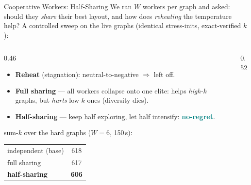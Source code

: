 \begin{frame}{Cooperative Workers: Half-Sharing}
  We ran $W$ workers per graph and asked: should they \emph{share} their best layout,
  and how does \emph{reheating} the temperature help? A controlled sweep on the live
  graphs (identical stress-inits, exact-verified $k$):
  \medskip
  \begin{columns}[T]
    \begin{column}{0.46\textwidth}
      \begin{itemize}
        \item \textbf{Reheat} (stagnation): neutral-to-negative $\Rightarrow$ left off.
        \item \textbf{Full sharing} --- all workers collapse onto one elite: helps
              \emph{high-}$k$ graphs, but \emph{hurts} low-$k$ ones (diversity dies).
        \item \textbf{Half-sharing} --- keep half exploring, let half intensify:
              \textcolor{teal}{\textbf{no-regret}}.
      \end{itemize}
      \medskip
      \footnotesize sum-$k$ over the hard graphs ($W{=}6$, 150\,s):
      \begin{center}\small
      \begin{tabular}{lc}
        \toprule
        independent (base)      & 618 \\
        full sharing            & 617 \\
        \textbf{half-sharing}   & \textbf{606} \\
        \bottomrule
      \end{tabular}
      \end{center}
    \end{column}
    \begin{column}{0.52\textwidth}
      \centering
\end{column}
\end{columns}
\end{frame}
